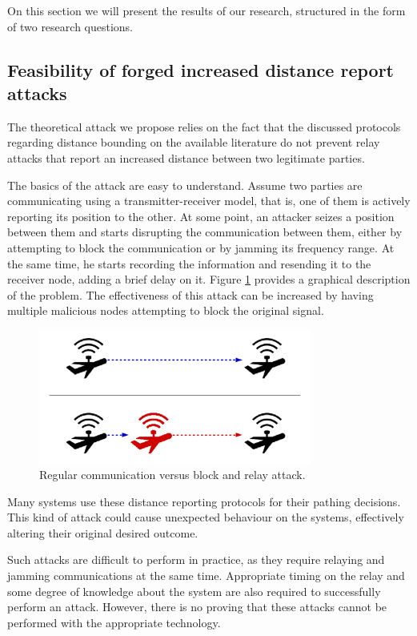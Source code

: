\documentclass{article}
\begin{document}
On this section we will present the results of our research, structured in the form of two research questions.

\subsection{Feasibility of forged increased distance report attacks}

The theoretical attack we propose relies on the fact that the discussed protocols regarding distance bounding on the available literature do not prevent relay attacks that report an increased distance between two legitimate parties.

The basics of the attack are easy to understand. Assume two parties are communicating using a transmitter-receiver model, that is, one of them is actively reporting its position to the other. At some point, an attacker seizes a position between them and starts disrupting the communication between them, either by attempting to block the communication or by jamming its frequency range. At the same time, he starts recording the information and resending it to the receiver node, adding a brief delay on it. Figure \ref{fig:attackexample1} provides a graphical description of the problem. The effectiveness of this attack can be increased by having multiple malicious nodes attempting to block the original signal.

\begin{figure}[h!]
  \centering
    \includegraphics[width=0.8\textwidth]{images/attack1.png}
  \caption{Regular communication versus block and relay attack.}
  \label{fig:attackexample1}
\end{figure}

Many systems use these distance reporting protocols for their pathing decisions. This kind of attack could cause unexpected behaviour on the systems, effectively altering their original desired outcome. 

Such attacks are difficult to perform in practice, as they require relaying and jamming communications at the same time. Appropriate timing on the relay and some degree of knowledge about the system are also required to successfully perform an attack. However, there is no proving that these attacks cannot be performed with the appropriate technology.
\end{document}
